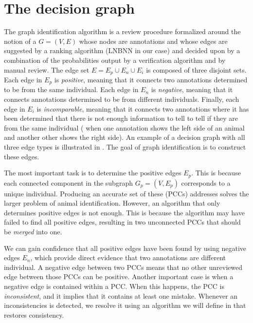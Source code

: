 \section{The decision graph}\label{sec:decisiongraph}

\decisiongraph{}

The graph identification algorithm is a review procedure formalized around the notion of a  $G
= (V, E)$ whose nodes are annotations and whose edges are suggested by a ranking algorithm (LNBNN in our case) and
decided upon by a combination of the probabilities output by a verification algorithm and by manual review.  The edge
set $E = E_p \cup E_n \cup E_i$ is composed of three disjoint sets. Each edge in $E_p$ is \emph{positive}, meaning that
it connects two annotations determined to be from the same individual. Each edge in $E_n$ is \emph{negative}, meaning
that it connects annotations determined to be from different individuals. Finally, each edge in $E_i$ is
\emph{incomparable}, meaning that it connects two annotations where it has been determined that there is not enough
information to tell to tell if they are from the same individual (\eg{} when one annotation shows the left side of an
animal and another other shows the right side).  An example of a decision graph with all three edge types is illustrated
in . The goal of graph identification is to construct these edges.

The most important task is to determine the positive edges $E_p$.  This is because each connected component in the
subgraph $G_p = (V, E_p)$ corresponds to a unique individual.  Producing an accurate set of these  (PCCs) addresses solves the larger problem of animal identification. However, an algorithm that
only determines positive edges is not enough.  This is because the algorithm may have failed to find all positive edges,
resulting in two unconnected PCCs that should be \emph{merged} into one.

We can gain confidence that all positive edges have been found by using negative edges $E_n$, which provide direct
evidence that two annotations are different individual.  A negative edge between two PCCs means that no other unreviewed
edge between those PCCs can be positive.  Another important case is when a negative edge is contained within a PCC.
When this happens, the PCC is \emph{inconsistent}, and it implies that it contains at least one mistake. Whenever an
inconsistencies is detected, we resolve it using an algorithm we will define in  that restores
consistency.

